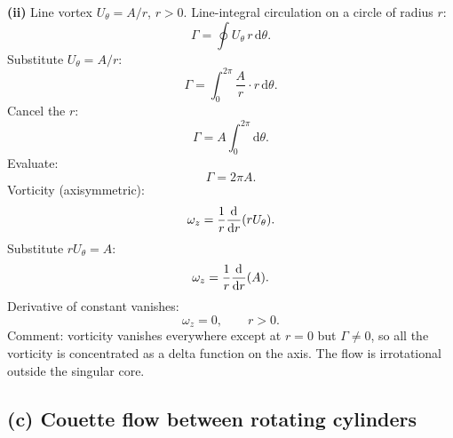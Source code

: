 \documentclass[11pt]{article}
\newcommand{\de}{\mathrm{d}}
\begin{document}
\textbf{(ii)} Line vortex $U_\theta = A/r$, $r>0$. Line-integral circulation on a circle of radius $r$:
\[ \Gamma = \oint U_\theta\,r\,\de\theta. \]
Substitute $U_\theta = A/r$:
\[ \Gamma = \int_0^{2\pi}\!\frac{A}{r}\cdot r\,\de\theta. \]
Cancel the $r$:
\[ \Gamma = A\!\int_0^{2\pi}\!\de\theta. \]
Evaluate:
\[ \Gamma = 2\pi A. \]
Vorticity (axisymmetric):
\[ \omega_z = \frac{1}{r}\dv{r}(rU_\theta). \]
Substitute $rU_\theta = A$:
\[ \omega_z = \frac{1}{r}\dv{r}(A). \]
Derivative of constant vanishes:
\[ \omega_z = 0,\qquad r>0. \]
Comment: vorticity vanishes everywhere except at $r=0$ but $\Gamma\neq 0$, so all the vorticity is concentrated as a delta function on the axis. The flow is irrotational outside the singular core.

\subsection*{(c) Couette flow between rotating cylinders}
\end{document}
